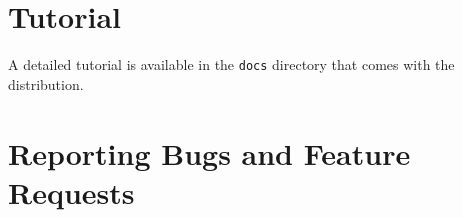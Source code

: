 \documentclass[titlepage,11pt]{article}
\begin{document}

\section{Tutorial}

\noindent
A detailed 
tutorial
is available in the {\tt docs} directory that comes with the distribution.

\section{Reporting Bugs and Feature Requests}
\end{document}
